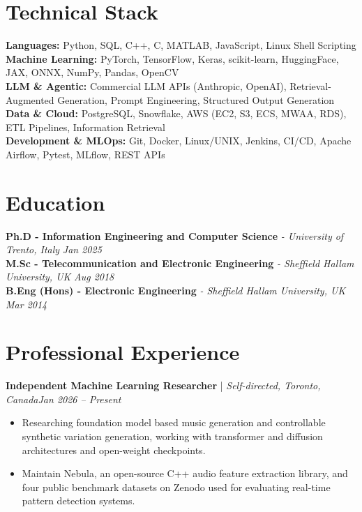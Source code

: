 \documentclass[11pt]{article}
\newenvironment{cvrole}[5]{%
  \par\noindent\textbf{\large #1} | \textit{\small #2, #3}\hfill \textit{\small #4 -- #5}\par
  \begin{itemize}[leftmargin=2em, itemsep=-0.3em, topsep=-0.4em]%
}{%
  \end{itemize}\par\noindent\mbox{}\par\vspace{-0.1em}%
}
\begin{document}
\section*{Technical Stack}

\textbf{Languages:} Python, SQL, C++, C, MATLAB, JavaScript, Linux Shell Scripting\\
\textbf{Machine Learning:} PyTorch, TensorFlow, Keras, scikit-learn, HuggingFace, JAX, ONNX, NumPy, Pandas, OpenCV\\
\textbf{LLM \& Agentic:} Commercial LLM APIs (Anthropic, OpenAI), Retrieval-Augmented Generation, Prompt Engineering, Structured Output Generation\\
\textbf{Data \& Cloud:} PostgreSQL, Snowflake, AWS (EC2, S3, ECS, MWAA, RDS), ETL Pipelines, Information Retrieval\\
\textbf{Development \& MLOps:} Git, Docker, Linux/UNIX, Jenkins, CI/CD, Apache Airflow, Pytest, MLflow, REST APIs

\section*{Education}
\textbf{Ph.D - Information Engineering and Computer Science} \textit{\small{ - University of Trento, Italy}} \hfill \textit{Jan 2025}\\[1pt]
\noindent\textbf{M.Sc - Telecommunication and Electronic Engineering} \textit{\small{ - Sheffield Hallam University, UK}} \hfill \textit{Aug 2018}\\[1pt]
\noindent\textbf{B.Eng (Hons) - Electronic Engineering} \textit{\small{ - Sheffield Hallam University, UK}} \hfill \textit{Mar 2014}

\section*{Professional Experience}

\begin{cvrole}{Independent Machine Learning Researcher}{Self-directed}{Toronto, Canada}{Jan 2026}{Present}
    \item Researching foundation model based music generation and controllable synthetic variation generation, working with transformer and diffusion architectures and open-weight checkpoints.
    \item Maintain Nebula, an open-source C++ audio feature extraction library, and four public benchmark datasets on Zenodo used for evaluating real-time pattern detection systems.
\end{cvrole}
\end{document}
